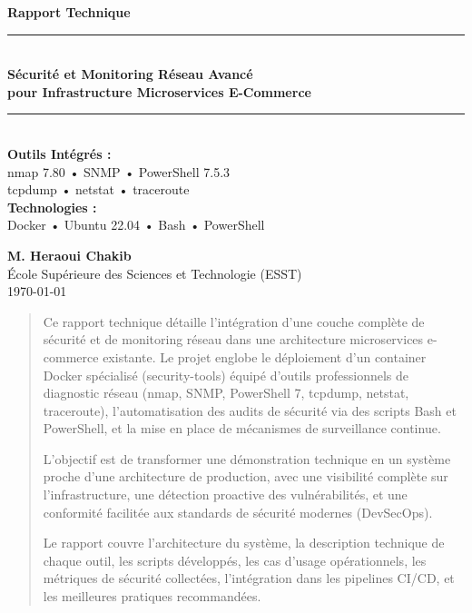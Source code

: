 \documentclass[11pt,a4paper]{report}
\begin{document}
\begin{titlepage}
    \begin{center}
        \vspace*{2cm}
        
        \textbf{\Huge Rapport Technique}\\[0.5cm]
        \rule{\linewidth}{0.5mm} \\[0.3cm]
        \textbf{\LARGE Sécurité et Monitoring Réseau Avancé}\\[0.2cm]
        \textbf{\LARGE pour Infrastructure Microservices E-Commerce}\\[0.2cm]
        \rule{\linewidth}{0.5mm} \\[1.5cm]
        
        \Large
        \textbf{Outils Intégrés :}\\[0.3cm]
        nmap 7.80 • SNMP • PowerShell 7.5.3\\
        tcpdump • netstat • traceroute\\[1cm]
        
        \textbf{Technologies :}\\[0.3cm]
        Docker • Ubuntu 22.04 • Bash • PowerShell\\[1.5cm]
        
        \vfill
        
        \textbf{\large M. Heraoui Chakib}\\[0.3cm]
        
        \large
        École Supérieure des Sciences et Technologie (ESST)\\[0.3cm]
        \today
        
    \end{center}
\end{titlepage}

\newpage

\begin{abstract}
Ce rapport technique détaille l'intégration d'une couche complète de sécurité et de monitoring réseau dans une architecture microservices e-commerce existante. Le projet englobe le déploiement d'un container Docker spécialisé (security-tools) équipé d'outils professionnels de diagnostic réseau (nmap, SNMP, PowerShell 7, tcpdump, netstat, traceroute), l'automatisation des audits de sécurité via des scripts Bash et PowerShell, et la mise en place de mécanismes de surveillance continue.

L'objectif est de transformer une démonstration technique en un système proche d'une architecture de production, avec une visibilité complète sur l'infrastructure, une détection proactive des vulnérabilités, et une conformité facilitée aux standards de sécurité modernes (DevSecOps).

Le rapport couvre l'architecture du système, la description technique de chaque outil, les scripts développés, les cas d'usage opérationnels, les métriques de sécurité collectées, l'intégration dans les pipelines CI/CD, et les meilleures pratiques recommandées.
\end{abstract}
\end{document}
